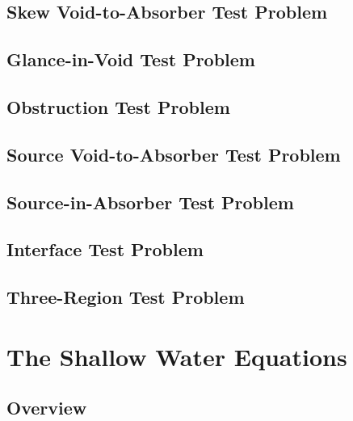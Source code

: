 \subsection{Skew Void-to-Absorber Test Problem\label{sec:skew_void_to_absorber}}
  
\subsection{Glance-in-Void Test Problem\label{sec:glance_in_void}}
  
\subsection{Obstruction Test Problem\label{sec:obstruction}}
  
\subsection{Source Void-to-Absorber Test Problem\label{sec:source_void_to_absorber}}
  
\subsection{Source-in-Absorber Test Problem\label{sec:source_in_absorber}}
  
\subsection{Interface Test Problem\label{sec:interface}}
  
\subsection{Three-Region Test Problem\label{sec:three_region}}
  
\section{The Shallow Water Equations\label{sec:shallow_water_results}}
\subsection{Overview}
  
